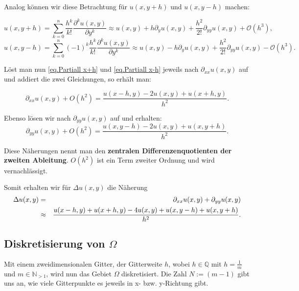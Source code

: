 Analog können wir diese Betrachtung für $u(x,y+h)$ und $u(x,y-h)$ machen:

\begin{equation}
u(x,y+h) = \sum_{k = 0}^{n} \frac {h^{k}} {k!} \frac {\partial^{k}u(x,y)} {\partial y^{k}} \approx u(x,y) + h \partial_{y} u(x,y) + \frac {h^{2}} {2!} \partial_{yy} u(x,y) + \mathcal{O}(h^{3}),
\end{equation}
\begin{equation}
u(x,y-h) = \sum_{k = 0}^{n} (-1)^{k} \frac {h^{k}} {k!} \frac {\partial^{k}u(x,y)} {\partial y^{k}} \approx u(x,y) - h \partial_{y} u(x,y) + \frac {h^{2}} {2!} \partial_{yy} u(x,y) - \mathcal{O}(h^{3}).
\end{equation}

Löst man nun \autoref{eq.Partiall x+h} und \autoref{eq.Partiall x-h} jeweils nach $\partial_{xx} u(x,y)$ auf und addiert die zwei Gleichungen, so erhält man:

\begin{equation}
\partial_{xx} u(x,y) + O(h^{2}) = \frac {u(x-h,y) - 2u(x,y) + u(x+h,y)} {h^{2}}.
\end{equation}

Ebenso lösen wir nach $\partial_{yy} u(x,y)$ auf und erhalten:
\begin{equation}
\partial_{yy} u(x,y) + O(h^{2}) = \frac {u(x,y-h) - 2u(x,y) + u(x,y+h)} {h^{2}}.
\end{equation}

Diese Näherungen nennt man den \textbf{zentralen Differenzenquotienten der zweiten Ableitung}. $O(h^{2})$ ist ein Term zweiter Ordnung und wird vernachlässigt.

Somit erhalten wir für $\Delta u(x,y)$ die Näherung
\begin{eqnarray}
\Delta u(x,y) &=& \partial_{xx} u(x,y) + \partial_{yy} u(x,y) \notag \\
&\approx& \frac {u(x-h,y) + u(x+h,y) - 4u(x,y) + u(x,y-h) + u(x,y+h)} {h^{2}}.\label{eq.Differenzenquotienten}
\end{eqnarray}

\subsection{Diskretisierung von $\Omega$}\label{ss.Diskretisierung}

Mit einem zweidimensionalen Gitter, der Gitterweite $h$, wobei $h \in \mathbb{Q}$ mit $h = \frac {1} {m}$ und $m \in \mathbb{N}_{>1}$, wird nun das Gebiet $\Omega$ diskretisiert. Die Zahl $N := (m-1)$ gibt uns an, wie viele Gitterpunkte es jeweils in x- bzw. y-Richtung gibt.\\

